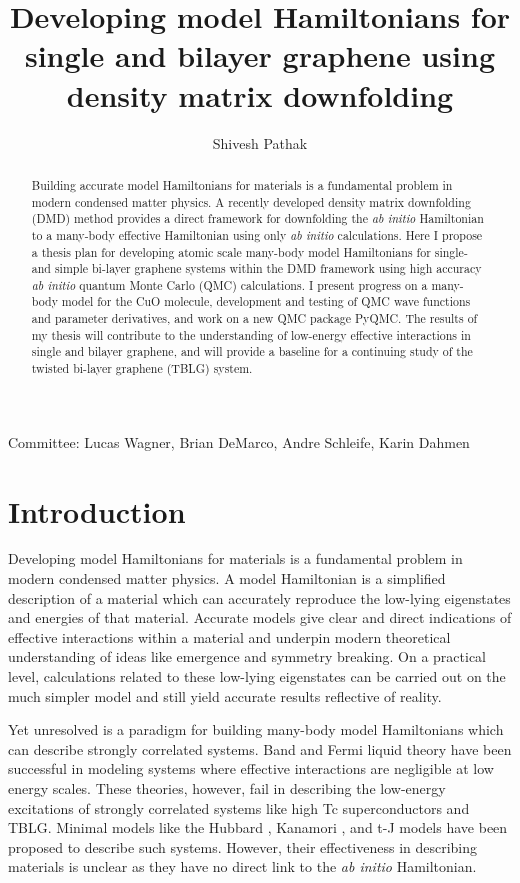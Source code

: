 \documentclass[12pt]{article}
\author{Shivesh Pathak}
\title{Developing model Hamiltonians for single and bilayer graphene using density matrix downfolding}
\begin{document}
\maketitle
\begin{abstract}
\thispagestyle{empty}
Building accurate model Hamiltonians for materials is a fundamental problem in modern condensed matter physics.
A recently developed density matrix downfolding (DMD) \cite{Zheng2017} method provides a direct framework for downfolding the \textit{ab initio} Hamiltonian to a many-body effective Hamiltonian using only \textit{ab initio} calculations. 
Here I propose a thesis plan for developing atomic scale many-body model Hamiltonians for single- and simple bi-layer graphene systems within the DMD framework using high accuracy \textit{ab initio} quantum Monte Carlo (QMC) calculations.
I present progress on a many-body model for the CuO molecule, development and testing of QMC wave functions and parameter derivatives, and work on a new QMC package PyQMC.
The results of my thesis will contribute to the understanding of low-energy effective interactions in single and bilayer graphene, and will provide a baseline for a continuing study of the twisted bi-layer graphene (TBLG) system.

\end{abstract}
Committee: Lucas Wagner, Brian DeMarco, Andre Schleife, Karin Dahmen
\clearpage
\pagebreak
\setcounter{page}{1}
\section{Introduction}
Developing model Hamiltonians for materials is a fundamental problem in modern condensed matter physics.
A model Hamiltonian is a simplified description of a material which can accurately reproduce the low-lying eigenstates and energies of that material.
Accurate models give clear and direct indications of effective interactions within a material and underpin modern theoretical understanding of ideas like emergence and symmetry breaking.
On a practical level, calculations related to these low-lying eigenstates can be carried out on the much simpler model and still yield accurate results reflective of reality.

Yet unresolved is a paradigm for building many-body model Hamiltonians which can describe strongly correlated systems.
Band and Fermi liquid theory have been successful in modeling systems where effective interactions are negligible at low energy scales.
These theories, however, fail in describing the low-energy excitations of strongly correlated systems like high Tc superconductors and TBLG.
Minimal models like the Hubbard \cite{Hubbard1963}, Kanamori \cite{10.1143/PTP.30.275},  and t-J \cite{Chao_1977} models have been proposed to describe such systems.
However, their effectiveness in describing materials is unclear as they have no direct link to the \textit{ab initio} Hamiltonian.
\end{document}
